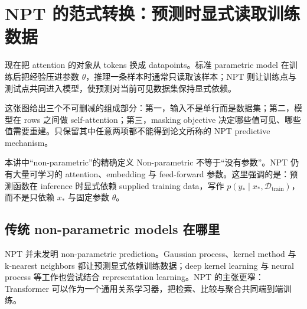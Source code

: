 \section{NPT 的范式转换：预测时显式读取训练数据}

现在把 attention 的对象从 tokens 换成 datapoints。标准 parametric model 在训练后把经验压进参数 $\theta$，推理一条样本时通常只读取该样本；NPT 则让训练点与测试点共同进入模型，使预测对当前可见数据集保持显式依赖。


这张图给出三个不可删减的组成部分：第一，输入不是单行而是数据集；第二，模型在 rows 之间做 self-attention；第三，masking objective 决定哪些值可见、哪些值需要重建。只保留其中任意两项都不能得到论文所称的 NPT predictive mechanism。


\begin{importantbox}{本讲中“non-parametric”的精确定义}
Non-parametric 不等于“没有参数”。NPT 仍有大量可学习的 attention、embedding 与 feed-forward 参数。这里强调的是：预测函数在 inference 时显式依赖 supplied training data，写作 $p(y_*\mid x_*,\mathcal{D}_{\mathrm{train}})$，而不是只依赖 $x_*$ 与固定参数 $\theta$。
\end{importantbox}


\subsection{传统 non-parametric models 在哪里}

NPT 并未发明 non-parametric prediction。Gaussian process、kernel method 与 k-nearest neighbors 都让预测显式依赖训练数据；deep kernel learning 与 neural process 等工作也尝试结合 representation learning。NPT 的主张更窄：Transformer 可以作为一个通用关系学习器，把检索、比较与聚合共同端到端训练。


